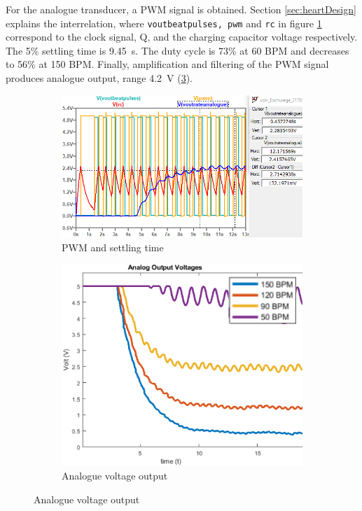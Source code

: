 For the analogue transducer, a PWM signal is obtained. Section \ref{sec:heartDesign} explains the interrelation, where \texttt{voutbeatpulses, pwm} and \texttt{rc} in figure \ref{subfig:pwm} correspond to the clock signal, Q, and the charging capacitor voltage respectively. The 5\% settling time is \SI{9.45}{s}. The duty cycle is 73\% at 60 BPM and decreases to 56\% at 150 BPM. Finally, amplification and filtering of the PWM signal produces analogue output, range \SI{4.2}{V} (\ref{subfig:analog}).

\begin{figure}[h]
 \footnotesize
   \centering
   \begin{subfigure}[]{0.57\textwidth}
        \includegraphics[width=\linewidth]{./Figures/pwm}
	  \caption{PWM and settling time} 
	  \label{subfig:pwm}	
   \end{subfigure}
   \begin{subfigure}[]{0.41\textwidth}
  	 \includegraphics[width=\linewidth]{./Figures/analog}
	  \caption{Analogue voltage output} 
	  \label{subfig:analog}	
   \end{subfigure}
 \end{figure}


